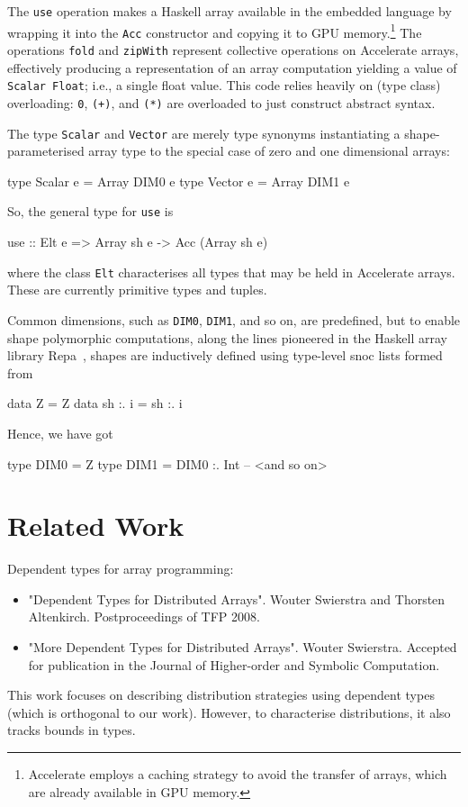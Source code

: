 \documentclass{llncs}
\begin{document}
The \verb+use+ operation makes a Haskell array available in the embedded language by wrapping it into the \verb+Acc+ constructor and copying it to GPU memory.\footnote{Accelerate employs a caching strategy to avoid the transfer of arrays, which are already available in GPU memory.} The operations \texttt{fold} and \texttt{zipWith} represent collective operations on Accelerate arrays, effectively producing a representation of an array computation yielding a value of
\texttt{Scalar Float}; i.e., a single float value. This code relies
heavily on (type class) overloading: \texttt{0}, \texttt{(+)}, and
\texttt{(*)} are overloaded to just construct abstract syntax. 

The type \verb+Scalar+ and \verb+Vector+ are merely type synonyms instantiating a shape-parameterised array type to the special case of zero and one dimensional arrays:
%
\begin{hcode}
type Scalar e = Array DIM0 e
type Vector e = Array DIM1 e
\end{hcode}
%
So, the general type for \verb+use+ is
%
\begin{hcode}
use :: Elt e => Array sh e -> Acc (Array sh e)
\end{hcode}
%
where the class \verb+Elt+ characterises all types that may be held in Accelerate arrays. These are currently primitive types and tuples.

Common dimensions, such as \verb+DIM0+, \verb+DIM1+, and so on, are predefined, but to enable shape polymorphic computations, along the lines pioneered in the Haskell array library Repa~\cite{keller-etal:repa}, shapes are inductively defined using type-level snoc lists formed from
%
\begin{hcode}
data Z       = Z
data sh :. i = sh :. i
\end{hcode}
%
Hence, we have got
%
\begin{hcode}
type DIM0 = Z
type DIM1 = DIM0 :. Int
-- <and so on>
\end{hcode}

\section{Related Work}
\label{sec:related-work}

Dependent types for array programming: 
\begin{itemize}
\item "Dependent Types for Distributed Arrays".
Wouter Swierstra and Thorsten Altenkirch. Postproceedings of TFP 2008.
\item "More Dependent Types for Distributed Arrays".
Wouter Swierstra. Accepted for publication in the Journal of Higher-order and Symbolic Computation.
\end{itemize}
This work focuses on describing distribution strategies using dependent types (which is orthogonal to our work). However, to characterise distributions, it also tracks bounds in types.
\end{document}
